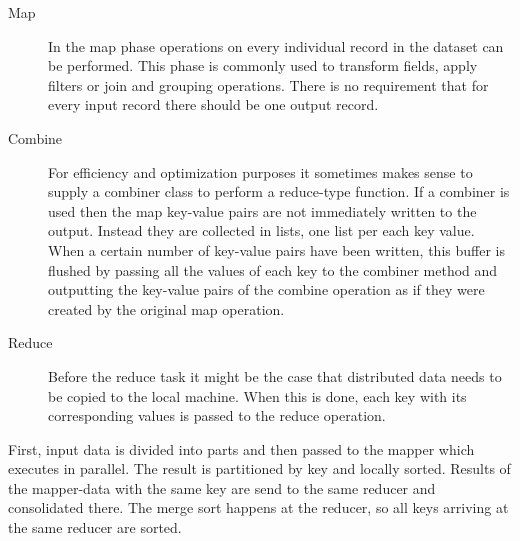 \begin{description}
  \item[Map] In the map phase operations on every individual record in the dataset can be performed. This phase is commonly used to transform fields, apply filters or join and grouping operations. There is no requirement that for every input record there should be one output record.
  \item[Combine] For efficiency and optimization purposes it sometimes makes sense to supply a combiner class to perform a reduce-type function. If a combiner is used then the map key-value pairs are not immediately written to the output. Instead they are collected in lists, one list per each key value. When a certain number of key-value pairs have been written, this buffer is flushed by passing all the values of each key to the combiner method and outputting the key-value pairs of the combine operation as if they were created by the original map operation.
  \item[Reduce] Before the reduce task it might be the case that distributed data needs to be copied to the local machine. When this is done, each key with its corresponding values is passed to the reduce operation. 
\end{description}

First, input data is divided into parts and then passed to the mapper which executes in parallel. The result is partitioned by key and locally sorted. Results of the mapper-data with the same key are send to the same reducer and consolidated there. The merge sort happens at the reducer, so all keys arriving at the same reducer are sorted. 

